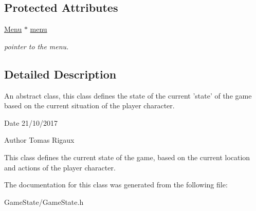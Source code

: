 \subsection*{Protected Attributes}
\begin{DoxyCompactItemize}
\item 
\hypertarget{classGameState_aebc12d6e90edfbe51a571858f6288f93}{\hyperlink{classMenu}{Menu} $\ast$ \hyperlink{classGameState_aebc12d6e90edfbe51a571858f6288f93}{menu}}\label{classGameState_aebc12d6e90edfbe51a571858f6288f93}

\begin{DoxyCompactList}\small\item\em pointer to the menu. \end{DoxyCompactList}\end{DoxyCompactItemize}


\subsection{Detailed Description}
An abstract class, this class defines the state of the current 'state' of the game based on the current situation of the player character. 

\begin{DoxyDate}{Date}
21/10/2017 
\end{DoxyDate}
\begin{DoxyAuthor}{Author}
Tomas Rigaux
\end{DoxyAuthor}
This class defines the current state of the game, based on the current location and actions of the player character. 

The documentation for this class was generated from the following file\-:\begin{DoxyCompactItemize}
\item 
Game\-State/Game\-State.\-h\end{DoxyCompactItemize}
